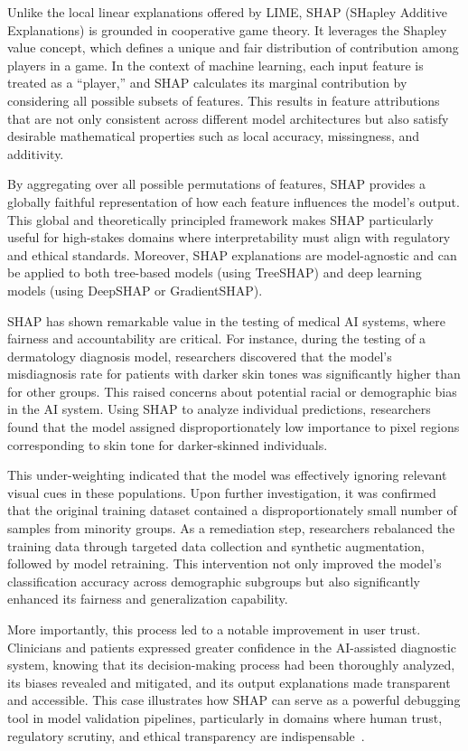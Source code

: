 \documentclass[manuscript,screen,review]{acmart}
\begin{document}
Unlike the local linear explanations offered by LIME, SHAP (SHapley Additive Explanations) is grounded in cooperative game theory. It leverages the Shapley value concept, which defines a unique and fair distribution of contribution among players in a game. In the context of machine learning, each input feature is treated as a ``player,'' and SHAP calculates its marginal contribution by considering all possible subsets of features. This results in feature attributions that are not only consistent across different model architectures but also satisfy desirable mathematical properties such as local accuracy, missingness, and additivity.

By aggregating over all possible permutations of features, SHAP provides a globally faithful representation of how each feature influences the model’s output. This global and theoretically principled framework makes SHAP particularly useful for high-stakes domains where interpretability must align with regulatory and ethical standards. Moreover, SHAP explanations are model-agnostic and can be applied to both tree-based models (using TreeSHAP) and deep learning models (using DeepSHAP or GradientSHAP).

SHAP has shown remarkable value in the testing of medical AI systems, where fairness and accountability are critical. For instance, during the testing of a dermatology diagnosis model, researchers discovered that the model’s misdiagnosis rate for patients with darker skin tones was significantly higher than for other groups. This raised concerns about potential racial or demographic bias in the AI system. Using SHAP to analyze individual predictions, researchers found that the model assigned disproportionately low importance to pixel regions corresponding to skin tone for darker-skinned individuals.

This under-weighting indicated that the model was effectively ignoring relevant visual cues in these populations. Upon further investigation, it was confirmed that the original training dataset contained a disproportionately small number of samples from minority groups. As a remediation step, researchers rebalanced the training data through targeted data collection and synthetic augmentation, followed by model retraining. This intervention not only improved the model’s classification accuracy across demographic subgroups but also significantly enhanced its fairness and generalization capability.

More importantly, this process led to a notable improvement in user trust. Clinicians and patients expressed greater confidence in the AI-assisted diagnostic system, knowing that its decision-making process had been thoroughly analyzed, its biases revealed and mitigated, and its output explanations made transparent and accessible. This case illustrates how SHAP can serve as a powerful debugging tool in model validation pipelines, particularly in domains where human trust, regulatory scrutiny, and ethical transparency are indispensable~\cite{Lundberg2017}.
\end{document}
